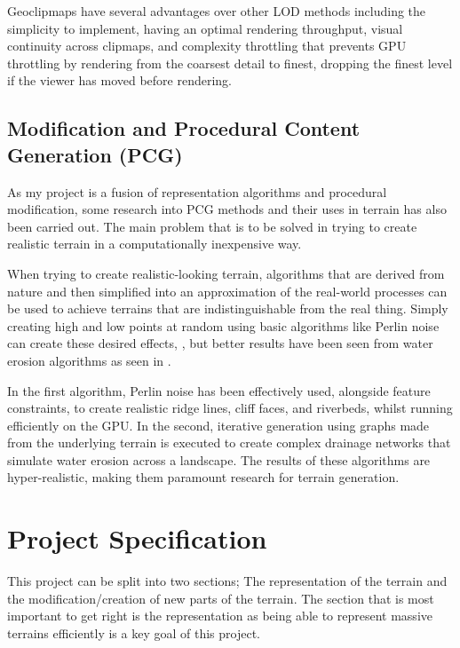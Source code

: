 \documentclass[notitlepage,12pt]{article}
\begin{document}
Geoclipmaps have several advantages over other LOD methods including the simplicity to implement, having an optimal rendering throughput, visual continuity across clipmaps, and complexity throttling that prevents GPU throttling by rendering from the coarsest detail to finest, dropping the finest level if the viewer has moved before rendering.

\subsection{Modification and Procedural Content Generation (PCG)} \label{pcg}

As my project is a fusion of representation algorithms and procedural modification, some research into PCG methods and their uses in terrain has also been carried out. The main problem that is to be solved in trying to create realistic terrain in a computationally inexpensive way.

When trying to create realistic-looking terrain, algorithms that are derived from nature and then simplified into an approximation of the real-world processes can be used to achieve terrains that are indistinguishable from the real thing. Simply creating high and low points at random using basic algorithms like Perlin noise can create these desired effects, \cite{perlin}, but better results have been seen from water erosion algorithms as seen in \cite{hydrology}.

In the first algorithm, Perlin noise has been effectively used, alongside feature constraints, to create realistic ridge lines, cliff faces, and riverbeds, whilst running efficiently on the GPU. In the second, iterative generation using graphs made from the underlying terrain is executed to create complex drainage networks that simulate water erosion across a landscape. The results of these algorithms are hyper-realistic, making them paramount research for terrain generation.

\section{Project Specification}

This project can be split into two sections; The representation of the terrain and the modification/creation of new parts of the terrain. The section that is most important to get right is the representation as being able to represent massive terrains efficiently is a key goal of this project.
\end{document}
